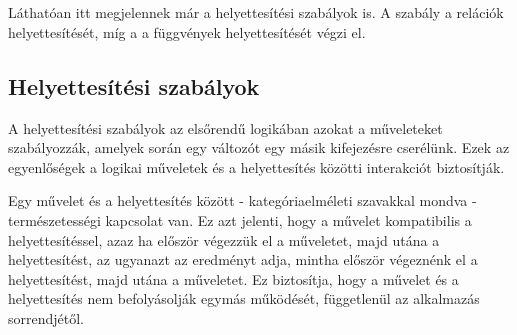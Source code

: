 \begin{code}
\AgdaSpace{}%
\AgdaSpace{}%
\AgdaSpace{}%
\AgdaOperator{\AgdaFunction{\textasciicircum{}}}\AgdaSpace{}%
\AgdaSpace{}%
\AgdaSpace{}%
\AgdaSpace{}%
\<%
\\
%
\>[6]\AgdaSpace{}%
\AgdaSymbol{:}%
\>[516I]\AgdaSpace{}%
\AgdaSymbol{\}\{}\AgdaSpace{}%
\AgdaSymbol{:}\AgdaSpace{}%
\AgdaSpace{}%
\AgdaSymbol{\}\{}\AgdaSpace{}%
\AgdaSymbol{:}\AgdaSpace{}%
\AgdaSpace{}%
\AgdaSpace{}%
\AgdaOperator{\AgdaFunction{\textasciicircum{}}}\AgdaSpace{}%
\AgdaSymbol{\}\{}\AgdaSymbol{\}\{}\AgdaSpace{}%
\AgdaSymbol{:}\AgdaSpace{}%
\AgdaSpace{}%
\AgdaSpace{}%
\AgdaSymbol{\}}\<%
\\
\>[.][@{}l@{}]\<[516I]%
\>[14]\AgdaSpace{}%
\AgdaSpace{}%
\AgdaSpace{}%
\AgdaSpace{}%
\AgdaOperator{\AgdaField{[}}\AgdaSpace{}%
\AgdaSpace{}%
\AgdaOperator{\AgdaField{]ᵗ}}\AgdaSpace{}%
\AgdaSpace{}%
\AgdaSpace{}%
\AgdaSpace{}%
\AgdaSymbol{(}\AgdaSpace{}%
\AgdaOperator{\AgdaField{\AgdaUnderscore{}[}}\AgdaSpace{}%
\AgdaSpace{}%
\AgdaOperator{\AgdaField{]ᵗ}}\AgdaSpace{}%
\AgdaSymbol{)}\<%
\end{code}
Láthatóan itt megjelennek már a helyettesítési szabályok is. A  szabály a relációk helyettesítését, míg a  a függvények helyettesítését végzi el.

\subsection{Helyettesítési szabályok}

A helyettesítési szabályok az elsőrendű logikában azokat a műveleteket szabályozzák, amelyek során egy változót egy másik kifejezésre cserélünk. Ezek az egyenlőségek a logikai műveletek és a helyettesítés közötti interakciót biztosítják.

Egy művelet és a helyettesítés között - kategóriaelméleti szavakkal mondva - természetességi kapcsolat van. Ez azt jelenti, hogy a művelet kompatibilis a helyettesítéssel, azaz ha először végezzük el a műveletet, majd utána a helyettesítést, az ugyanazt az eredményt adja, mintha először végeznénk el a helyettesítést, majd utána a műveletet. Ez biztosítja, hogy a művelet és a helyettesítés nem befolyásolják egymás működését, függetlenül az alkalmazás sorrendjétől.

